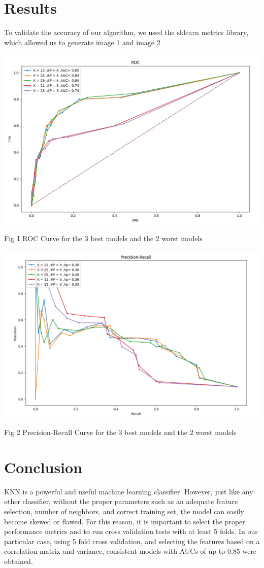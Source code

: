 \documentclass{article}
\begin{document}
 \section{Results}
To validate the accuracy of our algorithm, we used the sklearn metrics library, which allowed us to generate image 1 and image 2
\begin{center}
\includegraphics[scale=.2]{Roc2.png} 
\end{center}
Fig 1 ROC Curve for the 3 best models and the 2 worst models\\

\begin{center}
\includegraphics[scale=.2]{PR2.png}
\end{center}
Fig 2 Precision-Recall Curve for the 3 best models and the 2 worst models


\section{Conclusion}
KNN is a powerful and useful machine learning classifier. However, just like any other classifier, without the proper parameters such as an adequate feature selection, number of neighbors, and correct training set, the model can easily become skewed or flawed. For this reason, it is important to select the proper performance metrics and to run cross validation tests with at least 5 folds. In our particular case, using 5 fold cross validation, and selecting the features based on a correlation matrix and variance, consistent models with AUCs of up to 0.85 were obtained.   \\ 
 
 
\end{document}
